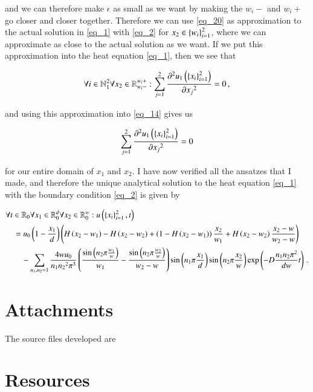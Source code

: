 \documentclass[11pt,english,a4paper]{article}
\begin{document}
\begin{flushleft}
and we can therefore make $\epsilon$ as small as we want by making the $w_i-$ and $w_i+$ go closer and closer together. Therefore we can use \eqref{eq_20} as approximation to the actual solution in \eqref{eq_1} with \eqref{eq_2} for $x_2\in\left\lbrace{w_i}\right\rbrace_{i=1}^2$, where we can approximate as close to the actual solution as we want. If we put this approximation into the heat equation \eqref{eq_1}, then we see that

\begin{align*}
\forall i \in \mathbb{N}_1^2 \forall x_2\in\mathbb{R}_{w_i-}^{w_i +} :\sum_{j=1}^2 \frac{\partial^2 u_1\left({\left\lbrace{x_i}\right\rbrace_{i=1}^2}\right)}{\partial {x_j}^2} = 0 \,,
\end{align*}

and using this approximation into \eqref{eq_14} gives us

\begin{align*}
\sum_{j=1}^2 \frac{\partial^2 u_1\left({\left\lbrace{x_i}\right\rbrace_{i=1}^2}\right)}{\partial {x_j}^2} = 0
\end{align*}

for our entire domain of $x_1$ and $x_2$. I have now verified all the ansatzes that I made, and therefore the unique analytical solution to the heat equation \eqref{eq_1} with the boundary condition \eqref{eq_2} is given by

\begin{align}
&\forall t\in \mathbb{R}_0 \forall x_1 \in \mathbb{R}_0^d \forall x_2 \in \mathbb{R}_0^w : u\left({\left\lbrace{x_i}\right\rbrace_{i=1}^2,t}\right) 
\\&\quad = u_0\left({1-\frac{x_1}{d}}\right)\left({H\left({x_2-w_1}\right)-H\left({x_2-w_2}\right) + \left({1-H\left({x_2-w_1}\right)}\right)\frac{x_2}{w_1} + H\left({x_2-w_2}\right)\frac{x_2-w}{w_2-w}}\right) 
\nonumber\\
&\qquad -\sum_{n_1,n_2=1} \frac{4 w u_0}{n_1 {n_2}^2 \pi^3}\left({\frac{\sin\left({n_2 \pi \frac{w_1}{w}}\right)}{w_1}-\frac{\sin\left({n_2 \pi \frac{w_2}{w}}\right)}{w_2-w}}\right)\sin\left({n_1\pi \frac{x_1}{d}}\right) \sin\left({n_2\pi \frac{x_2}{w}}\right) \exp\left({-D\frac{n_1 n_2 \pi^2}{dw} t}\right)\,.
\nonumber
\end{align}


\section{Attachments}

The source files developed are


\section{Resources}


\end{flushleft}
\end{document}
